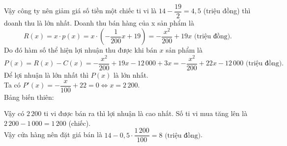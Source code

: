 \begin{ex}
{\begin{itemchoice}
Vậy công ty nên giảm giá số tiền một chiếc ti vi là $14-\dfrac{19}{2}=4{,}5$ (triệu đồng) thì doanh thu là lớn nhất.
\itemch Doanh thu bán hàng của x sản phẩm là
\[R(x)=x\cdot p(x)=x\cdot \left(-\dfrac{1}{200}x+19\right)=-\dfrac{x^2}{200}+19x \text{ (triệu đồng).}\]
Do đó hàm số thể hiện lợi nhuận thu được khi bán $x$ sản phẩm là
\[P(x)=R(x)-C(x)=-\dfrac{x^2}{200}+19x-12\,000+3x=-\dfrac{x^2}{200}+22x-12\,000 \text{ (triệu đồng).}\]
Để lợi nhuận là lớn nhất thì $P(x)$ là lớn nhất.\\
Ta có $P'(x)=-\dfrac{x}{100}+22=0\Leftrightarrow x=2\,200$.\\
Bảng biến thiên:
\begin{center}
\end{center}
Vậy có $2\,200$ ti vi được bán ra thì lợi nhuận là cao nhất. Số ti vi mua tăng lên là $2\,200-1\,000=1\,200$ (chiếc).\\
Vậy cửa hàng nên đặt giá bán là $14-0{,}5\cdot \dfrac{1\,200}{100}=8 \text{ (triệu đồng)}$.
\end{itemchoice}
}
\end{ex}

